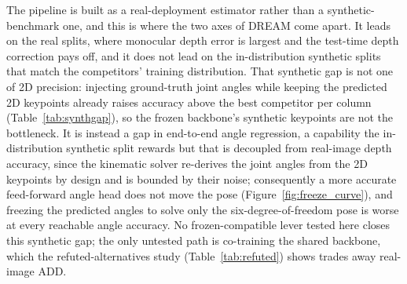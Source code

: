 The pipeline is built as a real-deployment estimator rather than a synthetic-benchmark one, and this is where the two axes of DREAM come apart. It leads on the real splits, where monocular depth error is largest and the test-time depth correction pays off, and it does not lead on the in-distribution synthetic splits that match the competitors' training distribution. That synthetic gap is not one of 2D precision: injecting ground-truth joint angles while keeping the predicted 2D keypoints already raises accuracy above the best competitor per column (Table~\ref{tab:synthgap}), so the frozen backbone's synthetic keypoints are not the bottleneck. It is instead a gap in end-to-end angle regression, a capability the in-distribution synthetic split rewards but that is decoupled from real-image depth accuracy, since the kinematic solver re-derives the joint angles from the 2D keypoints by design and is bounded by their noise; consequently a more accurate feed-forward angle head does not move the pose (Figure~\ref{fig:freeze_curve}), and freezing the predicted angles to solve only the six-degree-of-freedom pose is worse at every reachable angle accuracy. No frozen-compatible lever tested here closes this synthetic gap; the only untested path is co-training the shared backbone, which the refuted-alternatives study (Table~\ref{tab:refuted}) shows trades away real-image ADD.

